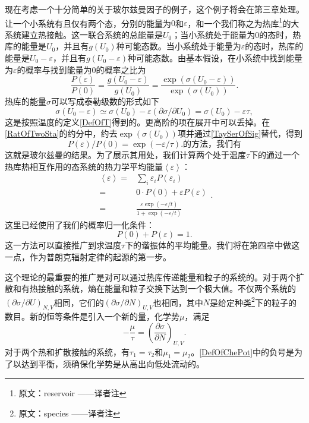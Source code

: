 现在考虑一个十分简单的关于玻尔兹曼因子的例子，这个例子将会在第三章处理。让一个小系统有且仅有两个态，分别的能量为$0$和$\varepsilon$，和一个我们称之为热库\footnote{原文：reservoir ——译者注}的大系统建立热接触。这一联合系统的总能量是$U_0$；当小系统处于能量为$0$的态时，热库的能量是$U_0$，并且有$g(U_0)$种可能态数。当小系统处于能量为$\varepsilon$的态时，热库的能量是$U_0-\varepsilon$，并且有$g(U_0-\varepsilon)$种可能态数。由基本假设，在小系统中找到能量为$\varepsilon$的概率与找到能量为$0$的概率之比为
\begin{equation}
    \frac{P\left( \varepsilon \right)}{P\left( 0 \right)}=\frac{g\left( U_0-\varepsilon \right)}{g\left( U_0 \right)}=\frac{\exp \left( \sigma \left( U_0-\varepsilon \right) \right)}{\exp \left( \sigma \left( U_0 \right) \right)}.\label{RatOfTwoSta}
\end{equation}
热库的能量$\sigma$可以写成泰勒级数的形式如下
\begin{equation}
    \sigma(U_0-\varepsilon)\simeq\sigma(U_0)-\varepsilon(\partial \sigma/\partial U_0)=\sigma(U_0)-\varepsilon\tau,\label{TaySerOfSig}
\end{equation}
这是按照温度的定义\eqref{DefOfT}得到的。更高阶的项在展开中可以丢掉。在\eqref{RatOfTwoSta}的约分中，约去$\exp(\sigma(U_0))$项并通过\eqref{TaySerOfSig}替代，得到
\begin{equation}
    P(\varepsilon)/P(0)=\exp(-\varepsilon/\tau).\label{Equ4}的方法，我们有
\end{equation}
这就是玻尔兹曼的结果。为了展示其用处，我们计算两个处于温度$\tau$下的通过一个热库热相互作用的态系统的热力学平均能量$\left< \varepsilon\right>$：
\begin{equation}
    \begin{aligned}
        \left< \varepsilon \right> =&\sum_{i}{\varepsilon _iP(\varepsilon _i)}
        \\
        =&0\cdot P\left( 0 \right) +\varepsilon P\left( \varepsilon \right) 
        \\
        =&\frac{\varepsilon \exp \left( -\varepsilon /t \right)}{1+\exp \left( -\varepsilon /t \right)}
    \end{aligned}.
\end{equation}
这里已经使用了我们的概率归一化条件：
\begin{equation}
    P(0)+P(\varepsilon)=1.
\end{equation}
这一方法可以直接推广到求温度$\tau$下的谐振体的平均能量。我们将在第四章中做这一点，作为普朗克辐射定律的起源的第一步。

这个理论的最重要的推广是对可以通过热库传递能量和粒子的系统的。对于两个扩散和有热接触的系统，熵在能量和粒子交换下达到一个极大值。不仅两个系统的$(\partial\sigma/\partial U)_{N,V}$相同，它们的$(\partial\sigma/\partial N)_{U,V}$也相同，其中$N$是给定种类\footnote{原文：species ——译者注}下的粒子的数目。新的恒等条件是引入一个新的量，化学势$\mu$，满足
\begin{equation}
    -\frac{\mu}{\tau}=\left( \frac{\partial \sigma}{\partial N} \right) _{U,V}.\label{DefOfChePot}
\end{equation}
对于两个热和扩散接触的系统，有$\tau_1=\tau_2$和$\mu_1=\mu_2$。\eqref{DefOfChePot}中的负号是为了以达到平衡，须确保化学势是从高出向低处流动的。

